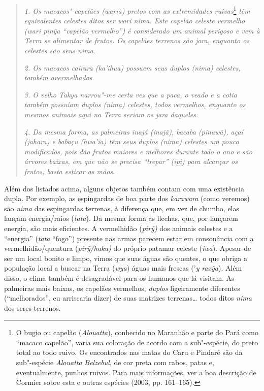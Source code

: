\begin{quote}
\emph{1. Os macacos"-capelães (\emph{waria}) pretos com as
extremidades ruivas}\footnote{O bugio ou capelão (\emph{Alouatta}),
  conhecido no Maranhão e parte do Pará como ``macaco capelão'', varia sua
  coloração de acordo com a sub"-espécie, do preto total ao todo ruivo.
  Os encontrados nas matas do Caru e Pindaré são da sub"-espécie
  \emph{Alouatta} \emph{Belzebul}, de cor preta com
  rabos, patas e, eventualmente, punhos ruivos. Para mais informações,
  ver a boa descrição de Cormier sobre esta e outras espécies (2003, pp.
  161--165).} \emph{têm equivalentes celestes ditos ser \emph{wari nima}. Este
  capelão celeste vermelho (\emph{wari} \emph{pinỹa} ``capelão vermelho'')
  é considerado um animal perigoso e vem à Terra se alimentar de frutos.
  Os capelães terrenos são \emph{jara}, enquanto os celestes são seus
  \emph{nima}}.

\noindent
\emph{2. Os macacos cairara (\emph{ka'ihua}) possuem seus duplos
(\emph{nima}) celestes, também avermelhados}.

\noindent
\emph{3. O velho Takya narrou"-me certa vez que a paca, o veado e a
cotia também possuíam duplos (\emph{nima}) celestes, todos vermelhos,
enquanto os mesmos animais aqui na Terra seriam os \emph{jara} daqueles.}

\noindent
\emph{4. Da mesma forma, as palmeiras inajá (\emph{inajã}), bacaba
(\emph{pinawã}), açaí (\emph{jahara}) e babaçu (\emph{hwa'ĩa}) têm seus
duplos (\emph{nima}) celestes um pouco modificados, pois dão frutos
maiores e melhores durante todo o ano e são árvores baixas, em que não
se precisa ``trepar'' (\emph{ipi}) para alcançar os frutos, basta esticar
as mãos}.
\end{quote}

Além dos listados acima, alguns objetos também contam com uma existência
dupla. Por exemplo, as espingardas de boa parte dos \emph{karawara}
(como veremos) são \emph{nima} das espingardas terrenas, à diferença
que, em vez de chumbo, elas lançam energia/raios (\emph{tata}). Da mesma
forma as flechas, que, por lançarem energia, são mais eficientes. A
vermelhidão (\emph{pirỹ)} dos animais celestes e a ``energia''
(\emph{tata} ``fogo'') presente nas armas parecem estar em consonância com
a vermelhidão/quentura (\emph{pirỹ/haku)} do próprio patamar celeste
(\emph{iwa}). Apesar de ser um local bonito e limpo, vimos que suas
águas são quentes, o que obriga a população local a buscar na Terra
(\emph{wya}) águas mais frescas ('\emph{y} \emph{raxỹa}). Além disso, o
clima também é desagradável para os humanos que lá visitam. As palmeiras
mais baixas, os capelães vermelhos, \emph{duplos} ligeiramente
diferentes (``melhorados'', eu arriscaria dizer) de suas matrizes
terrenas\ldots{} todos ditos \emph{nima} dos seres terrenos.

